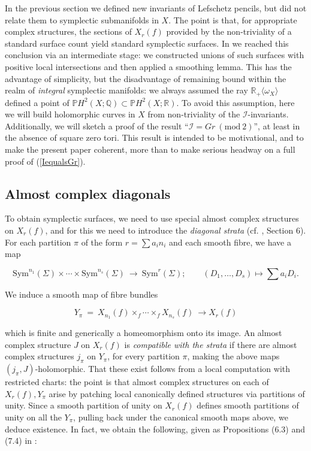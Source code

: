 \documentclass[10pt]{article}
\newcommand{\pp}{\mathbb{P}}
\newcommand{\qq}{\mathbb{Q}}
\newcommand{\rr}{\mathbb{R}}
\newcommand{\Sym}{\mathrm{Sym}}
\begin{document}
In the previous section we defined new invariants of Lefschetz
pencils, but did not relate them to symplectic submanifolds in $X$.
The point is 
that, for appropriate complex structures, the sections of $X_r(f)$
provided by the non-triviality of a standard surface count yield
standard symplectic surfaces.  In \cite{SKDIS} we reached this
conclusion via an intermediate stage:  we constructed unions of such
surfaces with positive local intersections and then applied a smoothing
lemma.  This has the advantage of simplicity, but the disadvantage of
remaining bound within the realm of \emph{integral} symplectic
manifolds:  we always assumed the ray $\rr_+ \langle \omega_X \rangle$
defined a point of $\pp H^2 (X; \qq) \subset \pp H^2(X;\rr)$.  To
avoid this assumption, here we will build holomorphic curves in $X$
from non-triviality of the $\mathcal{I}$-invariants.  Additionally,
we will sketch a proof of the result 
``$\mathcal{I}=Gr \ (\mathrm{mod} \ 2)$'', at least in the absence of
square zero tori.  This result is intended
to be motivational, and to make the present paper coherent,  more
than to make serious headway on a full proof of (\ref{IequalsGr}).  


\subsection{Almost complex diagonals}

To obtain symplectic surfaces, we need to use special almost
complex structures on $X_r(f)$, and for this we need to introduce the
\emph{diagonal strata} (cf. \cite{SKDIS}, Section 6).   For each
partition $\pi$ of the form $r = \sum a_i n_i$ and each smooth fibre,
we have a map  

$$\Sym^{n_1}(\Sigma) \times \cdots \times \Sym^{n_s}(\Sigma) \
\longrightarrow \ \Sym^r (\Sigma); \qquad (D_1, \ldots, D_s) \mapsto
\sum a_i D_i.$$

\noindent We induce a smooth map of fibre bundles 

$$Y_{\pi} \ = \ X_{n_1}(f) \times_f \cdots \times_f X_{n_s}(f) \ \rightarrow
X_r(f)$$

\noindent which is finite and generically a homeomorphism onto its
image.  An almost complex structure $J$ on $X_r(f)$ is
\emph{compatible with the strata} if there are almost complex
structures $j_{\pi}$ on $Y_{\pi}$, for every partition $\pi$, making
the above maps $(j_{\pi}, J)$-holomorphic.  That these exist
follows from a local computation with restricted charts:  the point is
that almost complex structures on each of $X_r(f), Y_{\pi}$ arise by
patching local canonically defined structures via partitions of
unity.  Since a smooth partition of unity on $X_r(f)$ defines smooth
partitions of unity on all the $Y_{\pi}$, pulling back under the
canonical smooth maps above, we deduce existence.  In fact, we obtain the
following, given as
Propositions (6.3) and (7.4) in \cite{SKDIS}:
\end{document}
